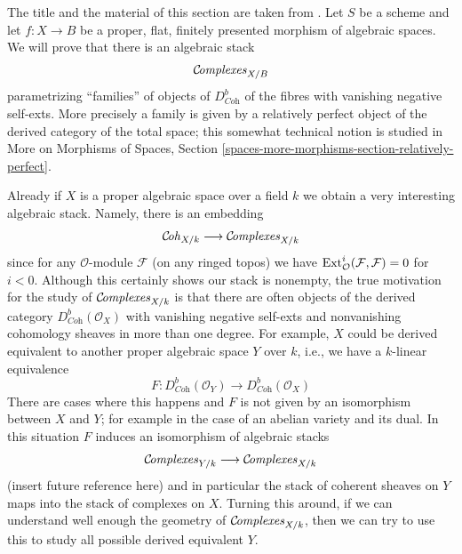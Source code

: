 \noindent
The title and the material of this section are taken from
\cite{lieblich-complexes}. Let $S$ be a scheme and let
$f : X \to B$ be a proper, flat, finitely presented morphism
of algebraic spaces. We will prove that there is an
algebraic stack
$$
\mathcal{C}\!\mathit{omplexes}_{X/B}
$$
parametrizing ``families'' of objects of $D^b_{\textit{Coh}}$
of the fibres with vanishing negative self-exts. More precisely
a family is given by a relatively perfect object of the derived
category of the total space; this somewhat technical notion
is studied in
More on Morphisms of Spaces, Section
\ref{spaces-more-morphisms-section-relatively-perfect}.

\medskip\noindent
Already if $X$ is a proper algebraic
space over a field $k$ we obtain a very interesting algebraic stack.
Namely, there is an embedding
$$
\mathcal{C}\!\mathit{oh}_{X/k} \longrightarrow \mathcal{C}\!\mathit{omplexes}_{X/k}
$$
since for any $\mathcal{O}$-module $\mathcal{F}$ (on any ringed topos)
we have $\mathop{\mathrm{Ext}}\nolimits^i_\mathcal{O}(\mathcal{F}, \mathcal{F}) = 0$ for $i < 0$.
Although this certainly shows our stack is nonempty, the
true motivation for the study of $\mathcal{C}\!\mathit{omplexes}_{X/k}$
is that there are often objects of the derived category
$D^b_{\textit{Coh}}(\mathcal{O}_X)$ with vanishing negative self-exts
and nonvanishing cohomology sheaves in more than one degree.
For example, $X$ could be derived equivalent to another
proper algebraic space $Y$ over $k$, i.e., we have a
$k$-linear equivalence
$$
F : D^b_{\textit{Coh}}(\mathcal{O}_Y)
\longrightarrow
D^b_{\textit{Coh}}(\mathcal{O}_X)
$$
There are cases where this happens and $F$ is not given by
an isomorphism between $X$ and $Y$; for example in the case
of an abelian variety and its dual. In this situation $F$ induces
an isomorphism of algebraic stacks
$$
\mathcal{C}\!\mathit{omplexes}_{Y/k}
\longrightarrow
\mathcal{C}\!\mathit{omplexes}_{X/k}
$$
(insert future reference here) and in particular the stack of coherent sheaves
on $Y$ maps into the stack of complexes on $X$. Turning this around,
if we can understand well enough the geometry of
$\mathcal{C}\!\mathit{omplexes}_{X/k}$, then we can try to use this to study all possible
derived equivalent $Y$.

